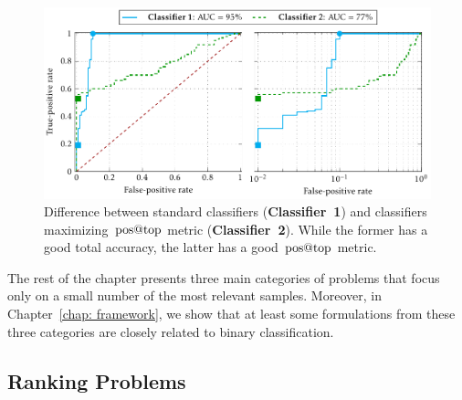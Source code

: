 \begin{figure}
  \centering
  \includegraphics{images/roc_space_log.pdf}
  \caption{Difference between standard classifiers (\textbf{Classifier~1}) and classifiers maximizing~$\operatorname{pos@top}$ metric (\textbf{Classifier~2}). While the former has a good total accuracy, the latter has a good~$\operatorname{pos@top}$ metric.}
  \label{fig: roc space log}
\end{figure}

The rest of the chapter presents three main categories of problems that focus only on a small number of the most relevant samples. Moreover, in Chapter~\ref{chap: framework}, we show that at least some formulations from these three categories are closely related to binary classification.

\subsection{Ranking Problems}

